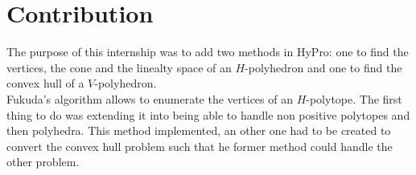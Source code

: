 \section{Contribution}
\label{section_contrib}
The purpose of this internship was to add two methods in HyPro: one to find the vertices, the cone and the linealty space of an $H$-polyhedron and one to find the convex hull of a $V$-polyhedron.\\
Fukuda's algorithm allows to enumerate the vertices of an $H$-polytope. The first thing to do was extending it into being able to handle non positive polytopes and then polyhedra. This method implemented, an other one had to be created to convert the convex hull problem such that he former method could handle the other problem.

